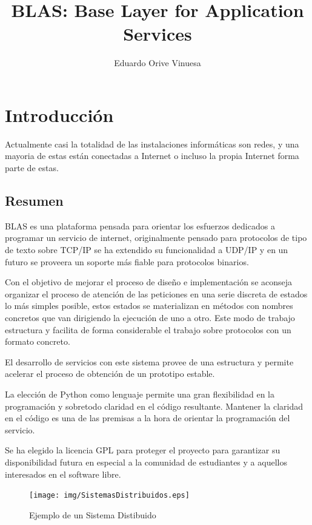 \documentclass[a4paper,spanish,12pt]{book}
\title{BLAS: Base Layer for Application Services}
\author{Eduardo Orive Vinuesa}
\begin{document}
\maketitle
\tableofcontents

\chapter{Introducción}
Actualmente casi la totalidad de las instalaciones inform\'aticas son redes, y una mayoria de estas est\'an conectadas a Internet o incluso la propia Internet forma parte de estas.
\section{Resumen}
BLAS es una plataforma pensada para orientar los esfuerzos dedicados a programar un servicio de internet, originalmente pensado para protocolos de tipo de texto sobre TCP/IP se ha extendido su funcionalidad a UDP/IP y en un futuro se proveera un soporte más fiable para protocolos binarios.

Con el objetivo de mejorar el proceso de diseño e implementación se aconseja organizar el proceso de atención de las peticiones en una serie discreta de estados lo más simples posible, estos estados se materializan en m\'etodos con nombres concretos que van dirigiendo la ejecución de uno a otro. Este modo de trabajo estructura y facilita de forma considerable el trabajo sobre protocolos con un formato concreto.

El desarrollo de servicios con este sistema provee de una estructura y permite acelerar el proceso de obtención de un prototipo estable.

La elección de Python como lenguaje permite una gran flexibilidad en la programación y sobretodo claridad en el código resultante. Mantener la claridad en el código es una de las premisas a la hora de orientar la programación del servicio.

Se ha elegido la licencia GPL para proteger el proyecto para garantizar su disponibilidad futura en especial a la comunidad de estudiantes y a aquellos interesados en el software libre.

\begin{figure}[h] %
	\texttt{[image: img/SistemasDistribuidos.eps]}	
	\caption{Ejemplo de un Sistema Distibuido}
	\label{fig:SistemasDistribuidos}
\end{figure}
\end{document}
